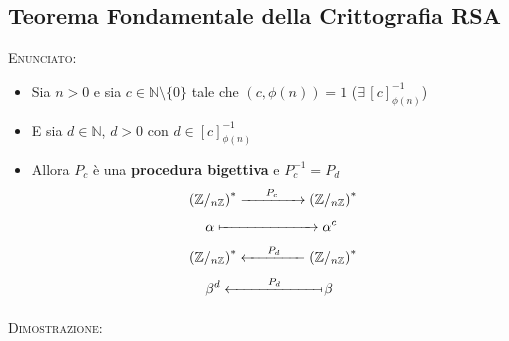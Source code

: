 \documentclass[10pt]{article}
\begin{document}
\subsection{Teorema Fondamentale della Crittografia RSA}
\textsc{Enunciato:}
\begin{itemize}
\item
Sia $n > 0$ e sia $c \in \mathbb{N} \setminus \{0\}$ tale che $(c, \phi(n)) = 1$ ($\exists \,\left[c\right]^{-1}_{\phi(n)}$)
\item
E sia $d \in \mathbb{N}$, $d > 0$ con $d \in \left[c\right]^{-1}_{\phi(n)}$
\item
Allora $P_c$ è una \textbf{procedura bigettiva} e $P^{-1}_c = P_d$
\begin{equation} 
\begin{split} 
& \left(\mathbb{Z}/_{n \mathbb{Z}}\right)^{*} \xrightarrow[\quad \quad \quad \quad]{P_c} \left(\mathbb{Z}/_{n \mathbb{Z}}\right)^{*} \\
& \,\,\quad \alpha \xmapsto{\quad \quad \quad \quad \quad \quad \,\,\,\,} \alpha^c \notag
\end{split}
\end{equation}
\begin{equation} 
\begin{split} 
& \left(\mathbb{Z}/_{n \mathbb{Z}}\right)^{*} \xleftarrow[\quad \quad \quad \quad]{P_d} \left(\mathbb{Z}/_{n \mathbb{Z}}\right)^{*} \\
& \quad\,\, \beta^d  \xleftarrow[\quad \quad \quad \quad \quad \quad \,\,\,]{P_d}\!\mapstochar \beta \notag
\end{split}
\end{equation}
\end{itemize}
\textsc{Dimostrazione:}
\end{document}

